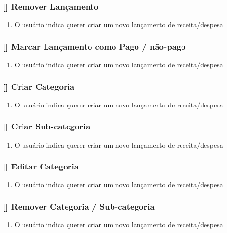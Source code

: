 \documentclass[a4paper]{abnt}
\begin{document}
\subsubsection{[\UC] Remover Lançamento}
\begin{enumerate}[itemsep=-1ex]
	\item O usuário indica querer criar um novo lançamento de receita/despesa
\end{enumerate}
\subsubsection{[\UC] Marcar Lançamento como Pago / não-pago}
\begin{enumerate}[itemsep=-1ex]
	\item O usuário indica querer criar um novo lançamento de receita/despesa
\end{enumerate}

\subsubsection{[\UC] Criar Categoria}
\begin{enumerate}[itemsep=-1ex]
	\item O usuário indica querer criar um novo lançamento de receita/despesa
\end{enumerate}

\subsubsection{[\UC] Criar Sub-categoria}
\begin{enumerate}[itemsep=-1ex]
	\item O usuário indica querer criar um novo lançamento de receita/despesa
\end{enumerate}

\subsubsection{[\UC] Editar Categoria}
\begin{enumerate}[itemsep=-1ex]
	\item O usuário indica querer criar um novo lançamento de receita/despesa
\end{enumerate}

\subsubsection{[\UC] Remover Categoria / Sub-categoria}
\begin{enumerate}[itemsep=-1ex]
	\item O usuário indica querer criar um novo lançamento de receita/despesa
\end{enumerate}
\end{document}
